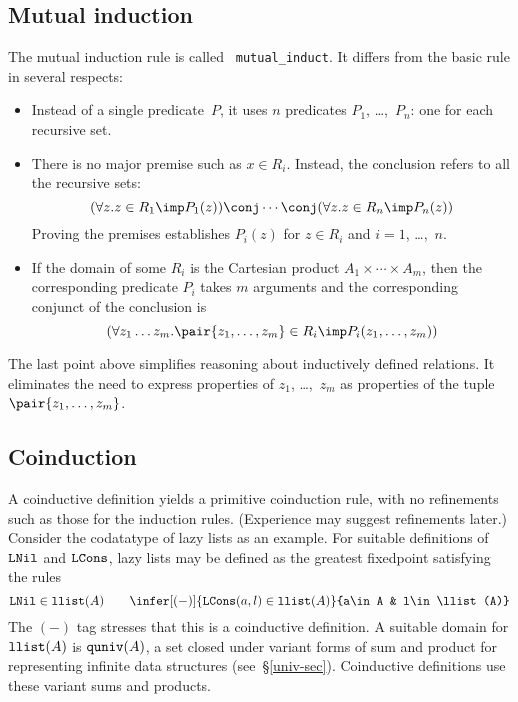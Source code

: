 \subsection{Mutual induction}
The mutual induction rule is called {\tt
mutual\_induct}.  It differs from the basic rule in several respects:
\begin{itemize}
\item Instead of a single predicate~$P$, it uses $n$ predicates $P_1$,
\ldots,~$P_n$: one for each recursive set.

\item There is no major premise such as $x\in R_i$.  Instead, the conclusion
refers to all the recursive sets:
\[ (\forall z.z\in R_1\imp P_1(z))\conj\cdots\conj
   (\forall z.z\in R_n\imp P_n(z))
\]
Proving the premises establishes $P_i(z)$ for $z\in R_i$ and $i=1$,
\ldots,~$n$.

\item If the domain of some $R_i$ is the Cartesian product
$A_1\times\cdots\times A_m$, then the corresponding predicate $P_i$ takes $m$
arguments and the corresponding conjunct of the conclusion is
\[ (\forall z_1\ldots z_m.\pair{z_1,\ldots,z_m}\in R_i\imp P_i(z_1,\ldots,z_m))
\]
\end{itemize}
The last point above simplifies reasoning about inductively defined
relations.  It eliminates the need to express properties of $z_1$,
\ldots,~$z_m$ as properties of the tuple $\pair{z_1,\ldots,z_m}$.

\subsection{Coinduction}\label{coind-sec}
A coinductive definition yields a primitive coinduction rule, with no
refinements such as those for the induction rules.  (Experience may suggest
refinements later.)  Consider the codatatype of lazy lists as an example.  For
suitable definitions of $\hbox{\tt LNil}$ and $\hbox{\tt LCons}$, lazy lists may be defined as the
greatest fixedpoint satisfying the rules
\[  \LNil\in\llist(A)  \qquad 
    \infer[(-)]{\LCons(a,l)\in\llist(A)}{a\in A & l\in\llist(A)}
\]
The $(-)$ tag stresses that this is a coinductive definition.  A suitable
domain for $\hbox{\tt llist}(A)$ is $\hbox{\tt quniv}(A)$, a set closed under variant forms of
sum and product for representing infinite data structures
(see~\S\ref{univ-sec}).  Coinductive definitions use these variant sums and
products.


